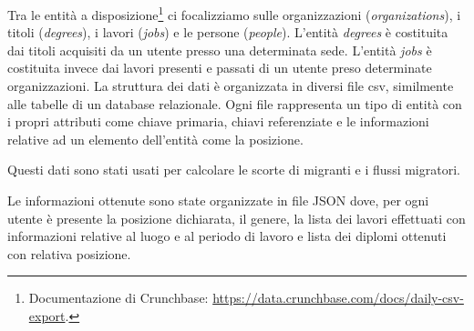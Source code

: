 Tra le entità a disposizione\footnote{Documentazione di Crunchbase: \url{https://data.crunchbase.com/docs/daily-csv-export}.} ci focalizziamo sulle organizzazioni (\textit{organizations}), i titoli (\textit{degrees}), i lavori (\textit{jobs}) e le persone (\textit{people}). L'entità \textit{degrees} è costituita dai titoli acquisiti da un utente presso una determinata sede. L'entità \textit{jobs} è costituita invece dai lavori presenti e passati di un utente preso determinate organizzazioni. 
La struttura dei dati è organizzata in diversi file csv, similmente alle tabelle di un database relazionale. Ogni file rappresenta un tipo di entità con i propri attributi come chiave primaria, chiavi referenziate e le informazioni relative ad un elemento dell'entità come la posizione.


Questi dati sono stati usati per calcolare le scorte di migranti e i flussi migratori. 

Le informazioni ottenute sono state organizzate in file JSON dove, per ogni utente è presente la posizione dichiarata, il genere, la lista dei lavori effettuati con informazioni relative al luogo e al periodo di lavoro e lista dei diplomi ottenuti con relativa posizione.


